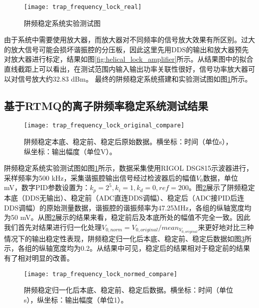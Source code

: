 \begin{figure}
    \centering
    \texttt{[image: trap\_frequency\_lock\_real]}
    \caption[阱频稳定系统实验测试图]{阱频稳定系统实验测试图\label{fig:trap_frequency_lock_real}}
\end{figure}


由于系统中需要使用放大器，而放大器对不同频率的信号放大效果有所区别。过大的放大信号可能会损坏谐振腔的分压板，因此这里先用DDS的输出和放大器预先对放大器进行标定，结果如图\ref{fig:helical_lock_amplifier}所示。从结果图中的拟合直线截距上可以看出，在测试范围内输入输出功率关联性很好，信号功率放大器可以对信号放大约32.83 dBm。
最终的阱频稳定系统搭建和实验测试图如图\ref{fig:trap_frequency_lock_real}所示。


\subsection[基于RTMQ的离子阱频率稳定系统测试结果]{基于RTMQ的离子阱频率稳定系统测试结果}

\begin{figure}
    \centering
    \texttt{[image: trap\_frequency\_lock\_original\_compare]}
    \caption[阱频稳定本底、稳定前、稳定后原始数据]{阱频稳定本底、稳定前、稳定后原始数据。横坐标：时间（单位s），纵坐标：输出幅度（单位V）。\label{fig:trap_frequency_lock_original_compare}}
\end{figure}



阱频稳定系统实验测试图如图\ref{fig:trap_frequency_lock_real}所示，数据采集使用RIGOL DSG815示波器进行，采样频率为500 kHz，采集谐振腔输出信号经过检波器后的幅值$V_0$数据，单位mV，数字PID参数设置为：$k_p=2^5,k_i=1,k_d=0, ref=200$。图\ref{fig:trap_frequency_lock_original_compare}展示了阱频稳定本底（DDS无输出）、稳定前（ADC直连DDS调幅）、稳定后（ADC接PID后连DDS调幅）的原始测量数据，谐振腔的谐振频率为47.25MHz，各组的纵轴宽度均为50 mV。从图\ref{fig:trap_frequency_lock_original_compare}展示的结果来看，稳定前后及本底所处的幅值不完全一致。因此我们首先对结果进行归一化处理$V_{0,norm}=V_{0,original}/mean_{V_{0,original}}$来更好地对比三种情况下的输出稳定性表现，阱频稳定归一化后本底、稳定前、稳定后数据如图\ref{fig:trap_frequency_lock_normed_compare}所示，各组的纵轴宽度均为0.2。从结果中可见，稳定后的结果相对于稳定前的结果有了相对明显的改善。

\begin{figure}
    \centering
    \texttt{[image: trap\_frequency\_lock\_normed\_compare]}
    \caption[阱频稳定归一化后本底、稳定前、稳定后数据]{阱频稳定归一化后本底、稳定前、稳定后数据。横坐标：时间（单位s），纵坐标：输出幅度（单位1）。\label{fig:trap_frequency_lock_normed_compare}}
\end{figure}

